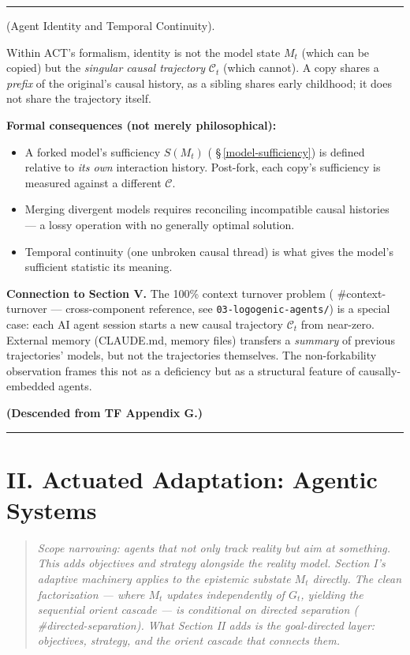 \documentclass[11pt,oneside]{article}
\newcounter{claim}[section]
\renewcommand{\theclaim}{\thesection.\arabic{claim}}
\newenvironment{segment}[2]{%
  \refstepcounter{claim}%
  \bigskip\noindent\hrule\smallskip
  \noindent{\bfseries #1~\theclaim}\enskip(#2).\par\smallskip
  \noindent\ignorespaces
}{%
  \par\smallskip\noindent\hrule\bigskip
}
\newenvironment{discussion}[1][]{\begin{segment}{Discussion}{#1}}{\end{segment}}
\begin{document}
\begin{discussion}[Agent Identity and Temporal Continuity]
Within ACT's formalism, identity is not the model state $M_t$ (which can be copied) but the \textit{singular causal trajectory} $\mathcal C_t$ (which cannot). A copy shares a \textit{prefix} of the original's causal history, as a sibling shares early childhood; it does not share the trajectory itself.

\textbf{Formal consequences (not merely philosophical):}

\begin{itemize}
  \item A forked model's sufficiency $S(M_t)$ ( \S\,\ref{model-sufficiency}) is defined relative to \textit{its own} interaction history. Post-fork, each copy's sufficiency is measured against a different $\mathcal{C}$.
  \item Merging divergent models requires reconciling incompatible causal histories — a lossy operation with no generally optimal solution.
  \item Temporal continuity (one unbroken causal thread) is what gives the model's sufficient statistic its meaning.
\end{itemize}


\textbf{Connection to Section V.} The 100\% context turnover problem ( \#context-turnover — cross-component reference, see \texttt{03-logogenic-agents/}) is a special case: each AI agent session starts a new causal trajectory $\mathcal C_t$ from near-zero. External memory (CLAUDE.md, memory files) transfers a \textit{summary} of previous trajectories' models, but not the trajectories themselves. The non-forkability observation frames this not as a deficiency but as a structural feature of causally-embedded agents.

\textbf{(Descended from TF Appendix G.)}

\end{discussion}

\section{II. Actuated Adaptation: Agentic Systems}

\begin{quote}\itshape
Scope narrowing: agents that not only track reality but aim at something. This adds objectives and strategy alongside the reality model. Section I's adaptive machinery applies to the epistemic substate $M_t$ directly. The clean factorization — where $M_t$ updates independently of $G_t$, yielding the sequential orient cascade — is conditional on directed separation ( \#directed-separation). What Section II adds is the goal-directed layer: objectives, strategy, and the orient cascade that connects them.
\end{quote}
\end{document}
